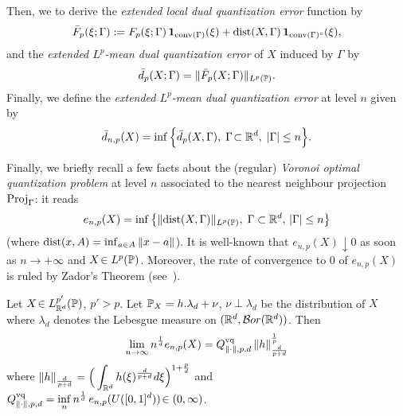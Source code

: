Then, we to derive the {\em extended  local dual quantization error} function by
\begin{equation}\label{def:Fbarp}
\bar F_p(\xi;\Gamma):= F_p(\xi;\Gamma)\,\mbox{\bf 1}_{\conv(\Gamma)}(\xi)+{\rm
dist}(X,\Gamma)\,\mbox{\bf 1}_{\conv(\Gamma)^c}(\xi),
\end{equation}
and  the {\em  extended $L^p$-mean dual quantization error} of $X$
induced by  $\Gamma$ by  
\begin{equation}\label{def:dbarpGamma}
\bar d_{p}(X; \Gamma)= \|\bar F_p(X;\Gamma)\|_{L^p(\Prob)}.
\end{equation}
Finally, we define   the {\em extended $L^p$-mean dual quantization error}  at level $n$ given by
\begin{equation}\label{def:dbarnp}
\bar d_{n,p}(X)=\inf \Big\{\bar d_p(X,\Gamma),\; \Gamma\!\subset \R^d, \;
|\Gamma|\le n\Big\}.
\end{equation}



Finally, we briefly recall a few facts about  the (regular) {\em Voronoi optimal quantization problem} at level $n$ associated to the nearest neighbour projection ${\rm Proj}_{\Gamma}$: it reads
\begin{equation}\label{def:enp}
e_{n,p}(X)=\inf \left\{ \| {\rm dist}(X,\Gamma)\|_{L^p(\Prob)} ,\; \Gamma\subset \R^d,\, |\Gamma|\le n\right\}
\end{equation}
(where ${\rm dist}(x,A)= \inf_{a\in A}\|x-a\|$). It is well-known that $e_{n,p}(X)\downarrow 0$ as soon as $n\to +\infty$ and
$X\!\in L^p(\mathbb{P})$. Moreover, the rate of convergence to $0$ of
$e_{n,p}(X)$ is ruled by  Zador's  Theorem (see~\cite{Foundations}).

\begin{thm}[Zador]
Let $X\!\in L_{\mathbb{R}^d}^{p'}(\mathbb{P})$, $p'\!>\!p$. Let $\mathbb{P}_X= h.\lambda_d +\nu$, $\nu\perp\lambda_d$ be the distribution of $X$ where $\lambda_d$ denotes the Lebesgue measure on $(\mathbb{R}^d,{\cal B}or(\mathbb{R}^d))$.
Then
\[
\lim_{n\to\infty} n^{\frac 1d} e_{n,p}(X) =
Q^{\text{vq}}_{\lVert\cdot\rVert, p, d}\, \|h\|_{\frac{d}{p+d}}^{\frac 1p}
\] 
where $ \|h\|_{\frac{d}{p+d}}=\displaystyle \Big(\int_{\mathbb{R}^d} h(\xi)^{\frac{d}{p+d}}d\xi\Big)^{1+\frac pd}$ and $\displaystyle Q^{\text{vq}}_{\lVert\cdot\rVert, p, d}= \inf_{n} n^{\frac 1d}\,e_{n,p}(U([0,1]^d))\!\in
(0,\infty)$.
\end{thm}

